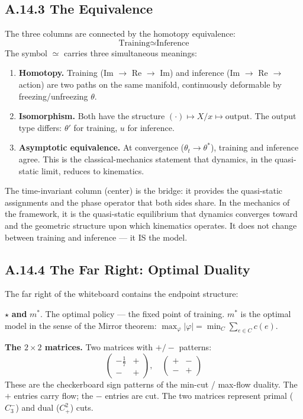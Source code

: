 \documentclass[11pt,a4paper]{article}
\theoremstyle{definition}
\theoremstyle{remark}
\begin{document}
\subsection{A.14.3 The Equivalence}

The three columns are connected by the homotopy equivalence:
\[
  \text{Training} \simeq \text{Inference}
\]
The symbol $\simeq$ carries three simultaneous meanings:

\begin{enumerate}[nosep]
\item[(i)] \textbf{Homotopy.} Training (Im $\to$ Re $\to$ Im) and inference (Im $\to$ Re $\to$ action) are two paths on the same manifold, continuously deformable by freezing/unfreezing $\theta$.
\item[(ii)] \textbf{Isomorphism.} Both have the structure $(\cdot) \mapsto X/x \mapsto \text{output}$. The output type differs: $\theta'$ for training, $u$ for inference.
\item[(iii)] \textbf{Asymptotic equivalence.} At convergence ($\theta_t \to \theta^*$), training and inference agree. This is the classical-mechanics statement that dynamics, in the quasi-static limit, reduces to kinematics.
\end{enumerate}

The time-invariant column (center) is the bridge: it provides the quasi-static assignments and the phase operator that both sides share. In the mechanics of the framework, it is the quasi-static equilibrium that dynamics converges toward and the geometric structure upon which kinematics operates. It does not change between training and inference --- it IS the model.


\subsection{A.14.4 The Far Right: Optimal Duality}

The far right of the whiteboard contains the endpoint structure:

\noindent$\star$ \textbf{and} $m^*$. The optimal policy --- the fixed point of training. $m^*$ is the optimal model in the sense of the Mirror theorem: $\max_\varphi |\varphi| = \min_C \sum_{e \in C} c(e)$.

\noindent\textbf{The $2 \times 2$ matrices.} Two matrices with $+/-$ patterns:
\[
  \begin{pmatrix} -\frac{1}{7} & + \\ - & + \end{pmatrix}, \quad \begin{pmatrix} + & - \\ - & + \end{pmatrix}
\]
These are the checkerboard sign patterns of the min-cut / max-flow duality. The $+$ entries carry flow; the $-$ entries are cut. The two matrices represent primal ($C_3^-$) and dual ($C_+^2$) cuts.
\end{document}
